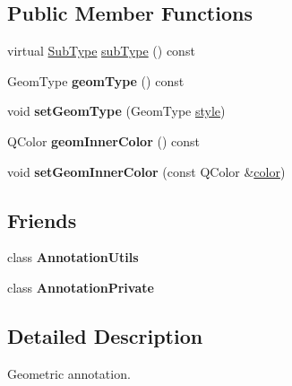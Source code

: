 \subsection*{Public Member Functions}
\begin{DoxyCompactItemize}
\item 
virtual \hyperlink{class_poppler_1_1_annotation_a2d592999c330949d64679cfa9e81113f}{Sub\+Type} \hyperlink{class_poppler_1_1_geom_annotation_a275700b4d5f06381f18ece403a1169d3}{sub\+Type} () const
\item 
\mbox{\label{class_poppler_1_1_geom_annotation_a26e339239acdc1c286979a9ded5f3019}} 
Geom\+Type {\bfseries geom\+Type} () const
\item 
\mbox{\label{class_poppler_1_1_geom_annotation_a08b08a374dc438e97cf0cf58b1d99980}} 
void {\bfseries set\+Geom\+Type} (Geom\+Type \hyperlink{class_poppler_1_1_annotation_a4857ee8533e1430f5776507f465040a8}{style})
\item 
\mbox{\label{class_poppler_1_1_geom_annotation_acb6cb451dac98bc343e884e4834806c8}} 
Q\+Color {\bfseries geom\+Inner\+Color} () const
\item 
\mbox{\label{class_poppler_1_1_geom_annotation_a64fe69c529f05be304fe01875f47b73a}} 
void {\bfseries set\+Geom\+Inner\+Color} (const Q\+Color \&\hyperlink{structcolor}{color})
\end{DoxyCompactItemize}
\subsection*{Friends}
\begin{DoxyCompactItemize}
\item 
\mbox{\label{class_poppler_1_1_geom_annotation_a13daac1cbc1823e18498579fc26b344f}} 
class {\bfseries Annotation\+Utils}
\item 
\mbox{\label{class_poppler_1_1_geom_annotation_add0bc3e32e560f9e9eb3025587c1ad54}} 
class {\bfseries Annotation\+Private}
\end{DoxyCompactItemize}


\subsection{Detailed Description}
Geometric annotation. 

